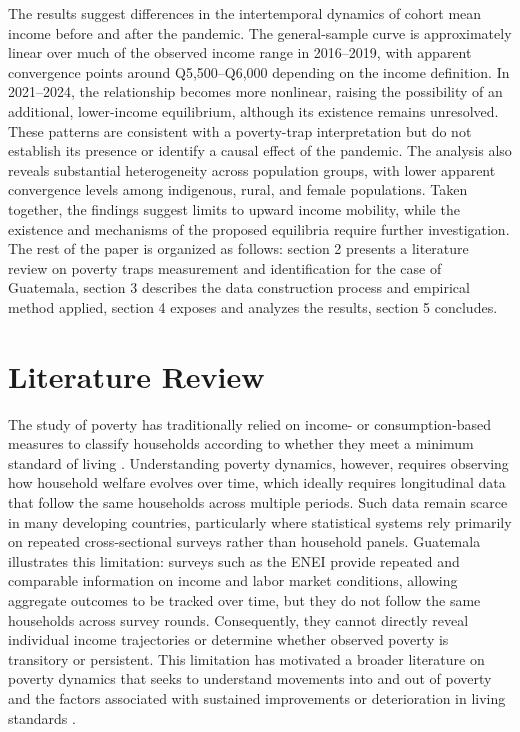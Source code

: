 \documentclass{article}
\begin{document}
The results suggest differences in the intertemporal dynamics of cohort mean income before and after the pandemic. The general-sample curve is approximately linear over much of the observed income range in 2016--2019, with apparent convergence points around Q5,500--Q6,000 depending on the income definition. In 2021--2024, the relationship becomes more nonlinear, raising the possibility of an additional, lower-income equilibrium, although its existence remains unresolved. These patterns are consistent with a poverty-trap interpretation but do not establish its presence or identify a causal effect of the pandemic. The analysis also reveals substantial heterogeneity across population groups, with lower apparent convergence levels among indigenous, rural, and female populations. Taken together, the findings suggest limits to upward income mobility, while the existence and mechanisms of the proposed equilibria require further investigation. The rest of the paper is organized as follows: section 2 presents a literature review on poverty traps measurement and identification for the case of Guatemala, section 3 describes the data construction process and empirical method applied, section 4 exposes and analyzes the results, section 5 concludes. 
\section{Literature Review}

The study of poverty has traditionally relied on income- or consumption-based measures to classify households according to whether they meet a minimum standard of living \parencite{ravallion1998}. Understanding poverty dynamics, however, requires observing how household welfare evolves over time, which ideally requires longitudinal data that follow the same households across multiple periods. Such data remain scarce in many developing countries, particularly where statistical systems rely primarily on repeated cross-sectional surveys rather than household panels. Guatemala illustrates this limitation: surveys such as the ENEI provide repeated and comparable information on income and labor market conditions, allowing aggregate outcomes to be tracked over time, but they do not follow the same households across survey rounds. Consequently, they cannot directly reveal individual income trajectories or determine whether observed poverty is transitory or persistent. This limitation has motivated a broader literature on poverty dynamics that seeks to understand movements into and out of poverty and the factors associated with sustained improvements or deterioration in living standards \parencite{baulch2000}.
\end{document}

